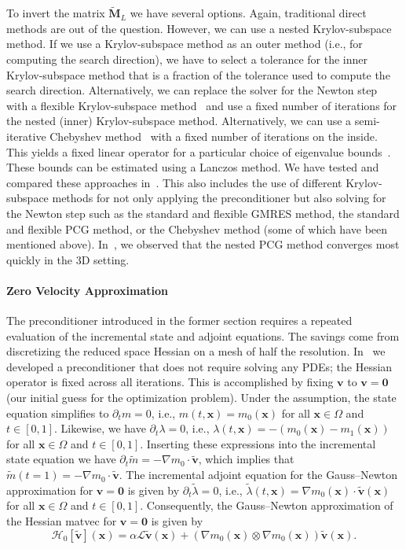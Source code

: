 \documentclass[11pt]{amsart}
\newcommand\op[1]{\ensuremath{\mathcal{#1}}}
\newcommand\di[1]{\ensuremath{\mathbf{#1}}}
\newcommand\igrad{\ensuremath{\nabla}}
\renewcommand{\vec}[1]{\ensuremath{\boldsymbol{#1}}}
\begin{document}
To invert the matrix $\di{\tilde{M}}_L$ we have several options. Again, traditional direct methods are out of the question. However, we can use a nested Krylov-subspace method. If we use a Krylov-subspace method as an outer method (i.e., for computing the search direction), we have to select a tolerance for the inner Krylov-subspace method that is a fraction of the tolerance used to compute the search direction. Alternatively, we can replace the solver for the Newton step with a flexible Krylov-subspace method~\cite{Axelsson:1991a,Notay:2000a} and use a fixed number of iterations for the nested (inner) Krylov-subspace method. Alternatively, we can use a semi-iterative Chebyshev method~\cite{Gutknecht:2002a} with a fixed number of iterations on the inside. This yields a fixed linear operator for a particular choice of eigenvalue bounds~\cite{Golub:1961a}. These bounds can be estimated using a Lanczos method. We have tested and compared these approaches in~\cite{Mang:2017a,Mang:2019a}. This also includes the use of different Krylov-subspace methods for not only applying the preconditioner but also solving for the Newton step such as the standard and flexible GMRES method, the standard and flexible PCG method, or the Chebyshev method (some of which have been mentioned above). In~\cite{Mang:2019a}, we observed that the nested PCG method converges most quickly in the 3D setting.




\paragraph{Zero Velocity Approximation}

The preconditioner introduced in the former section requires a repeated evaluation of the incremental state and adjoint equations. The savings come from discretizing the reduced space Hessian on a mesh of half the resolution. In~\cite{Brunn:2020a} we developed a preconditioner that does not require solving any PDEs; the Hessian operator is fixed across all iterations. This is accomplished by fixing $\vec{v}$ to $\vec{v} = \vec{0}$ (our initial guess for the optimization problem). Under the assumption, the state equation simplifies to $\partial_t m = 0$, i.e., $m(t, \vec{x}) = m_0(\vec{x})$ for all $\vec{x} \in \Omega$ and $t\in[0,1]$. Likewise, we have $\partial_t \lambda = 0$, i.e., $\lambda(t, \vec{x}) = -(m_0(\vec{x}) - m_1(\vec{x}))$ for all $\vec{x} \in \Omega$ and $t\in[0,1]$. Inserting these expressions into the incremental state equation we have $\partial_t \tilde{m} = - \igrad m_0 \cdot \vec{\tilde{v}}$, which implies that $\tilde{m}(t=1) = - \igrad m_0 \cdot \vec{\tilde{v}}$. The incremental adjoint equation for the Gauss--Newton approximation for $\vec{v} = \vec{0}$ is given by $\partial_t \tilde{\lambda} = 0$, i.e., $\tilde{\lambda}(t, \vec{x}) = \igrad m_0(\vec{x}) \cdot \vec{\tilde{v}}(\vec{x})$ for all $\vec{x} \in \Omega$ and $t\in[0,1]$. Consequently, the Gauss--Newton approximation of the Hessian matvec for $\vec{v} = \vec{0}$ is given by
\[
\op{H}_{0}[\vec{\tilde{v}}](\vec{x}) = \alpha\op{L}\vec{\tilde{v}}(\vec{x}) + (\igrad m_0(\vec{x}) \otimes \igrad m_0(\vec{x})) \vec{\tilde{v}}(\vec{x}).
\]
\end{document}
